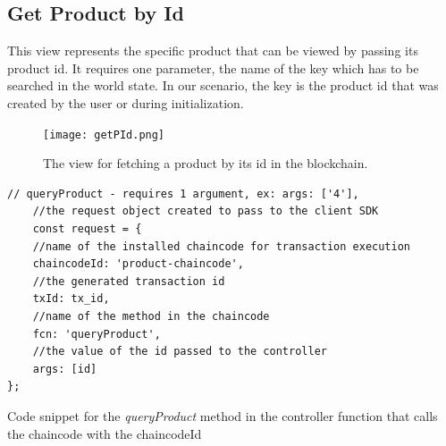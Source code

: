 \documentclass[
  a4paper,  %
  twoside,  %
  bibliography=totoc,
  headsepline,
  cleardoublepage=empty,
  parskip=half,
  draft=false
]{scrbook}
\begin{document}
\subsection{Get Product by Id}
This view represents the specific product that can be viewed by passing its product id. It requires one parameter, the name of the key which has to be searched in the world state. In our scenario, the key is the product id that was created by the user or during initialization.
\begin{figure}[h!]
\begin{center}
\texttt{[image: getPId.png]}
\caption{The view for fetching a product by its id in the blockchain.}
\label{fig:gpi}
\end{center}
\end{figure}
\begin{Listing}[h!]
\begin{lstlisting}
// queryProduct - requires 1 argument, ex: args: ['4'],
    //the request object created to pass to the client SDK
    const request = { 
    //name of the installed chaincode for transaction execution
    chaincodeId: 'product-chaincode', 
    //the generated transaction id
    txId: tx_id,
    //name of the method in the chaincode
    fcn: 'queryProduct',
    //the value of the id passed to the controller
    args: [id]                    
};
\end{lstlisting}
\caption{Code snippet for the \textit{queryProduct} method in the controller function that calls the chaincode with the chaincodeId}
\label{lst:gapi}
\end{Listing}
\end{document}
